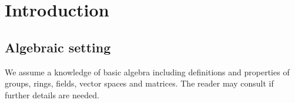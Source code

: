 \chapter{Introduction}

\section{Algebraic setting} %
\label{sec:algebraic_setting}

We assume a knowledge of basic algebra including definitions and properties of groups, rings,
fields, vector spaces and matrices. The reader may consult \cite{lang:algebra} if further details
are needed.



